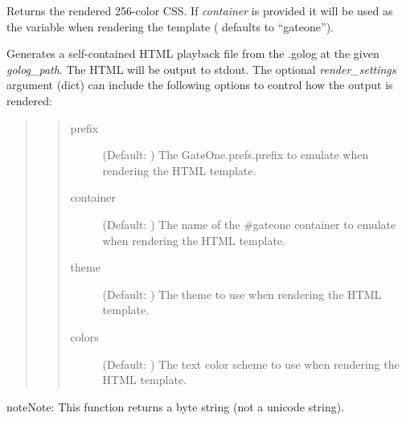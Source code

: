 \documentclass[letterpaper,10pt,openany]{sphinxmanual}
\begin{document}
\begin{fulllineitems}
\label{Developer/logviewer:logviewer.get_256_colors}
Returns the rendered 256-color CSS.  If \emph{container} is provided it will be
used as the  variable when rendering the template (
defaults to ``gateone'').

\end{fulllineitems}


\begin{fulllineitems}
\label{Developer/logviewer:logviewer.render_html_playback}
Generates a self-contained HTML playback file from the .golog at the given
\emph{golog\_path}.  The HTML will be output to stdout.  The optional
\emph{render\_settings} argument (dict) can include the following options
to control how the output is rendered:
\begin{quote}
\begin{quote}\begin{description}
\item[{prefix}] \leavevmode
(Default: ) The GateOne.prefs.prefix to emulate when
rendering the HTML template.

\item[{container}] \leavevmode
(Default: ) The name of the \#gateone container to emulate
when rendering the HTML template.

\item[{theme}] \leavevmode
(Default: ) The theme to use when rendering the HTML
template.

\item[{colors}] \leavevmode
(Default: ) The text color scheme to use when rendering
the HTML template.

\end{description}\end{quote}
\end{quote}

\begin{notice}{note}{Note:}
This function returns a byte string (not a unicode string).
\end{notice}

\end{fulllineitems}
\end{document}
